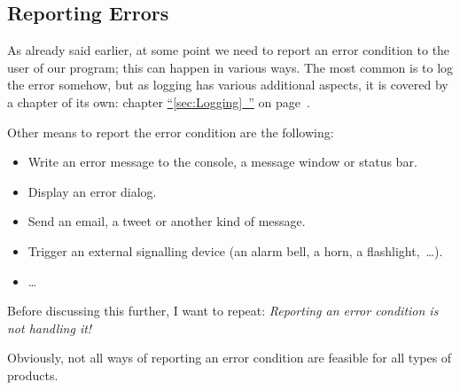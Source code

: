 \documentclass[11pt,a4paper, titlepage, parskip=half, headsepline, footsepline, cleardoublepage=current, headheight=1cm]{scrbook}
\newcommand*{\tqfullvref}[1]{\hyperref[{#1}]{“\ref*{#1}~\nameref*{#1}”} on page~\pageref{#1}}
\begin{document}
\subsection{Reporting Errors}\label{sec:ReportingErrors}
As already said earlier, at some point we need to report an error condition to the user of our program; this can happen in various ways. The most common is to log the error somehow, but as logging has various additional aspects, it is covered by a chapter of its own: chapter \tqfullvref{sec:Logging}.

Other means to report the error condition are the following:
\begin{itemize}
\item{Write an error message to the console, a message window or status bar.}
\item{Display an error dialog.}
\item{Send an email, a tweet or another kind of message.}
\item{Trigger an external signalling device (an alarm bell, a horn, a flashlight,~…).}
\item{…}
\end{itemize}

Before discussing this further, I want to repeat: \textit{Reporting an error condition is not handling it!}

Obviously, not all ways of reporting an error condition are feasible for all types of products.
\end{document}
